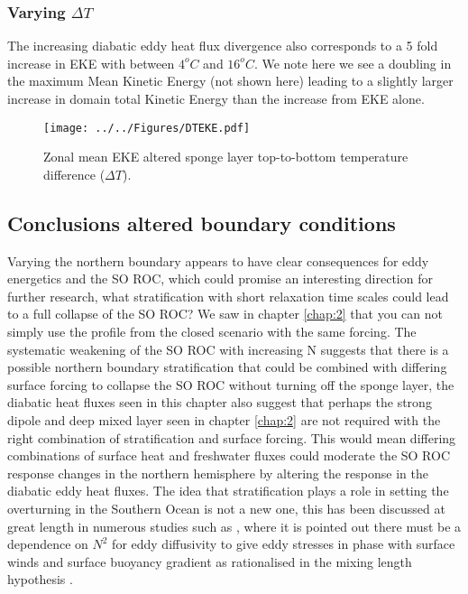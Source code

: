 \subsubsection*{Varying $\Delta T$}
The increasing diabatic eddy heat flux divergence also corresponds to a 5 fold increase in EKE with between $4^oC$ and $16^oC$.   We note here we see a doubling in the maximum Mean Kinetic Energy (not shown here) leading to a slightly larger increase in domain total Kinetic Energy than the increase from EKE alone.  
\begin{figure}[H]
\center
\noindent \texttt{[image: ../../Figures/DTEKE.pdf]} 
\caption{Zonal mean EKE  altered sponge layer top-to-bottom temperature difference ($\Delta T$).}
\label{fig:DTEKE}
\end{figure}
\subsection{Conclusions altered boundary conditions}

Varying the northern boundary appears to have clear consequences for eddy energetics and the SO ROC, which could promise an interesting direction for further research, what stratification with short relaxation time scales could lead to a full collapse of the SO ROC? We saw in chapter \ref{chap:2} that you can not simply use the profile from the closed scenario with the same forcing. The systematic weakening of the SO ROC with increasing N suggests that there is a possible northern boundary stratification that could be combined with differing surface forcing to collapse the SO ROC without turning off the sponge layer, the diabatic heat fluxes seen in this chapter also suggest that perhaps the strong dipole and deep mixed layer seen in chapter \ref{chap:2} are not required with the right combination of stratification and surface forcing. This would mean differing combinations of surface heat and freshwater fluxes could moderate the SO ROC response changes in the northern hemisphere by altering the response in the diabatic eddy heat fluxes. The idea that stratification plays a role in setting the overturning in the Southern Ocean is not a new one, this has been discussed at great length in numerous studies such as \citet{Ferreira2005}, where it is pointed out there must be a dependence on $N^2$ for eddy diffusivity to give eddy stresses in phase with surface winds and surface buoyancy gradient as rationalised in the mixing length hypothesis \citep{McWilliams2002}.
